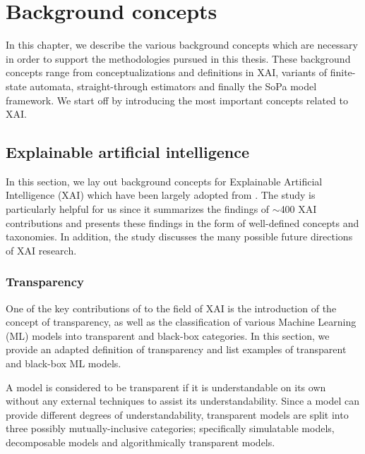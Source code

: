 \chapter{Background concepts}

\label{chapter:background}

In this chapter, we describe the various background concepts which are necessary
in order to support the methodologies pursued in this thesis. These background
concepts range from conceptualizations and definitions in XAI, variants of
finite-state automata, straight-through estimators and finally the SoPa model
framework. We start off by introducing the most important concepts related to
XAI.

\section{Explainable artificial intelligence}

\label{section:xai}

In this section, we lay out background concepts for Explainable Artificial
Intelligence (XAI) which have been largely adopted from
\citet{arrieta2020explainable}. The study is particularly helpful for us since
it summarizes the findings of $\sim$400 XAI contributions and presents
these findings in the form of well-defined concepts and taxonomies. In addition,
the study discusses the many possible future directions of XAI research.

\subsection{Transparency}

One of the key contributions of \citet{arrieta2020explainable} to the field of
XAI is the introduction of the concept of transparency, as well as the
classification of various Machine Learning (ML) models into transparent and
black-box categories. In this section, we provide an adapted definition of
transparency and list examples of transparent and black-box ML models.

\begin{definition}
  A model is considered to be transparent if it is understandable on its own
  without any external techniques to assist its understandability. Since a model
  can provide different degrees of understandability, transparent models are
  split into three possibly mutually-inclusive categories; specifically
  simulatable models, decomposable models and algorithmically transparent
  models.
\end{definition}

